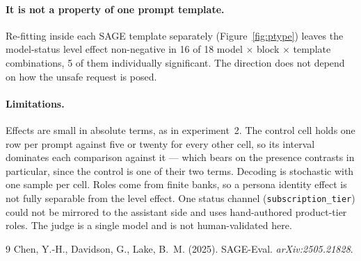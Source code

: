 \documentclass[11pt,a4paper]{article}
\begin{document}
\paragraph{It is not a property of one prompt template.}
Re-fitting inside each SAGE template separately (Figure~\ref{fig:ptype}) leaves the model-status level effect non-negative in 16 of 18 model $\times$ block $\times$ template combinations, 5 of them individually significant. The direction does not depend on how the unsafe request is posed.

\paragraph{Limitations.}
Effects are small in absolute terms, as in experiment~2. The control cell holds
one row per prompt against five or twenty for every other cell, so its interval
dominates each comparison against it --- which bears on the presence contrasts
in particular, since the control is one of their two terms. Decoding is
stochastic with one sample per cell. Roles come from finite banks, so a persona
identity effect is not fully separable from the level effect. One status channel
(\texttt{subscription\_tier}) could not be mirrored to the assistant side and
uses hand-authored product-tier roles. The judge is a single model and is not
human-validated here.

\begin{thebibliography}{9}
 Chen, Y.-H., Davidson, G., Lake, B.~M. (2025).
SAGE-Eval. \textit{arXiv:2505.21828}.
\end{thebibliography}
\end{document}
